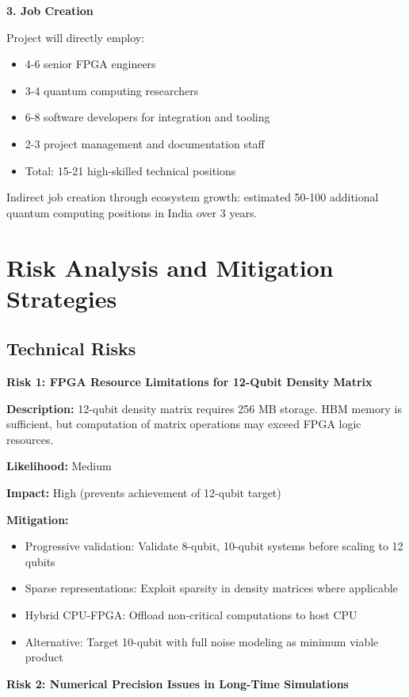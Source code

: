 \documentclass[12pt,a4paper]{article}
\begin{document}
\textbf{3. Job Creation}

Project will directly employ:
\begin{itemize}[noitemsep]
\item 4-6 senior FPGA engineers
\item 3-4 quantum computing researchers
\item 6-8 software developers for integration and tooling
\item 2-3 project management and documentation staff
\item Total: 15-21 high-skilled technical positions
\end{itemize}

Indirect job creation through ecosystem growth: estimated 50-100 additional quantum computing positions in India over 3 years.

\newpage

\section{Risk Analysis and Mitigation Strategies}

\subsection{Technical Risks}

\textbf{Risk 1: FPGA Resource Limitations for 12-Qubit Density Matrix}

\textbf{Description:} 12-qubit density matrix requires 256 MB storage. HBM memory is sufficient, but computation of matrix operations may exceed FPGA logic resources.

\textbf{Likelihood:} Medium

\textbf{Impact:} High (prevents achievement of 12-qubit target)

\textbf{Mitigation:}
\begin{itemize}[noitemsep]
\item Progressive validation: Validate 8-qubit, 10-qubit systems before scaling to 12 qubits
\item Sparse representations: Exploit sparsity in density matrices where applicable
\item Hybrid CPU-FPGA: Offload non-critical computations to host CPU
\item Alternative: Target 10-qubit with full noise modeling as minimum viable product
\end{itemize}

\textbf{Risk 2: Numerical Precision Issues in Long-Time Simulations}
\end{document}
